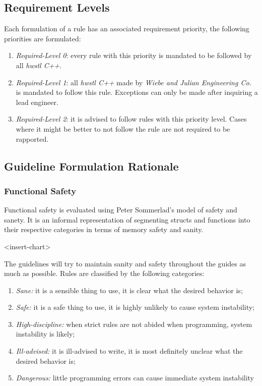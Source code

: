 \documentclass[12pt]{article}
\newcommand{\requirementpriority}[1]{\emph{Required-Level #1}}
\begin{document}
\subsection{Requirement Levels}
Each formulation of a rule has an associated requirement priority, the
following priorities are formulated:
\begin{enumerate}
   \item \requirementpriority{0}: every rule with this priority is mandated to
be followed by all \textit{hwstl C++}.
   \item \requirementpriority{1}: all \textit{hwstl C++} made by \textit{Wiebe
and Julian Engineering Co.} is mandated to follow this rule. Exceptions can
only be made after inquiring a lead engineer.
   \item \requirementpriority{2}: it is advised to follow rules with this
priority level. Cases where it might be better to not follow the rule are not
required to be rapported.
\end{enumerate}

\pagebreak
\subsection{Guideline Formulation Rationale}
\subsubsection{Functional Safety}
Functional safety is evaluated using Peter Sommerlad's model of safety and
sanety.\cite{SANE_AND_SAFE_CPP_CLASSES} It is an informal representation of
segmenting structs and functions into their respective categories in terms of
memory safety and sanity.

<insert-chart>

The guidelines will try to maintain sanity and safety throughout the guides as
much as possible. Rules are classified by the following categories:

\begin{enumerate}
   \item \emph{Sane:} it is a sensible thing to use, it is clear what the
   desired behavior is;
   \item \emph{Safe:} it is a safe thing to use, it is highly unlikely to cause
   system instability;
   \item \emph{High-discipline:} when strict rules are not abided when
   programming, system instability is likely;
   \item \emph{Ill-advised:} it is ill-advised to write, it is most definitely
   unclear what the desired behavior is;
   \item \emph{Dangerous:} little programming errors can cause immediate system
   instability
\end{enumerate}
\end{document}
